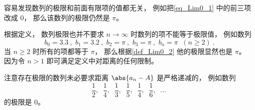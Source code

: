 \begin{example}{}
容易发现数列的极限和前面有限项的值都无关， 例如把\autoref{eq_Lim0_1} 中的前三项改成 $0$， 那么该数列的极限仍然是 $\pi$。
\end{example}

\begin{example}{}
根据定义， 数列极限也并不要求 $n\to \infty$ 时数列的项不能等于极限值， 例如数列
\begin{equation}
b_0 = 3.3~,\,\, b_1 = 3.2~, \,\, b_2 = \pi~, \,\, b_3 = \pi~, \,\, b_n = \pi \;\; (n \ge 2)~.
\end{equation}
当 $n \ge 2$ 时所有的项都等于 $\pi$， 那么根据\autoref{def_Lim0_2} 他的极限显然也是 $\pi$。 因为令 $n > 1$ 即可满足定义中对距离的任何限制。
\end{example}

\begin{example}{}
注意存在极限的数列未必要求距离 $\abs{a_n - A}$ 是严格递减的， 例如数列
\begin{equation}
\frac{1}{2},\;\; \frac{1}{4},\;\; \frac{1}{3},\;\; \frac{1}{5},\;\; \frac{1}{4},\;\; \frac{1}{6},\;\; \dots~
\end{equation}
的极限是 $0$。
\end{example}
